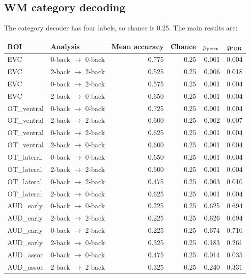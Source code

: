 \documentclass[11pt,a4paper]{article}
\begin{document}
\subsection{WM category decoding}

The category decoder has four labels, so chance is 0.25. The main results are:

\begin{longtable}{p{}p{}rrrr}
\toprule
\textbf{ROI} & \textbf{Analysis} & \textbf{Mean accuracy} & \textbf{Chance} & \textbf{\(p_{\rm perm}\)} & \textbf{\(q_{\rm FDR}\)}\\
\midrule
EVC & 0-back \(\rightarrow\) 0-back & 0.775 & 0.25 & 0.001 & 0.004\\
EVC & 2-back \(\rightarrow\) 2-back & 0.525 & 0.25 & 0.006 & 0.018\\
EVC & 0-back \(\rightarrow\) 2-back & 0.575 & 0.25 & 0.001 & 0.004\\
EVC & 2-back \(\rightarrow\) 0-back & 0.650 & 0.25 & 0.001 & 0.004\\
OT\_ventral & 0-back \(\rightarrow\) 0-back & 0.725 & 0.25 & 0.001 & 0.004\\
OT\_ventral & 2-back \(\rightarrow\) 2-back & 0.600 & 0.25 & 0.002 & 0.007\\
OT\_ventral & 0-back \(\rightarrow\) 2-back & 0.625 & 0.25 & 0.001 & 0.004\\
OT\_ventral & 2-back \(\rightarrow\) 0-back & 0.600 & 0.25 & 0.001 & 0.004\\
OT\_lateral & 0-back \(\rightarrow\) 0-back & 0.650 & 0.25 & 0.001 & 0.004\\
OT\_lateral & 2-back \(\rightarrow\) 2-back & 0.600 & 0.25 & 0.001 & 0.004\\
OT\_lateral & 0-back \(\rightarrow\) 2-back & 0.475 & 0.25 & 0.003 & 0.010\\
OT\_lateral & 2-back \(\rightarrow\) 0-back & 0.625 & 0.25 & 0.001 & 0.004\\
AUD\_early & 0-back \(\rightarrow\) 0-back & 0.225 & 0.25 & 0.625 & 0.694\\
AUD\_early & 2-back \(\rightarrow\) 2-back & 0.225 & 0.25 & 0.626 & 0.694\\
AUD\_early & 0-back \(\rightarrow\) 2-back & 0.225 & 0.25 & 0.674 & 0.710\\
AUD\_early & 2-back \(\rightarrow\) 0-back & 0.325 & 0.25 & 0.183 & 0.261\\
AUD\_assoc & 0-back \(\rightarrow\) 0-back & 0.475 & 0.25 & 0.014 & 0.035\\
AUD\_assoc & 2-back \(\rightarrow\) 2-back & 0.325 & 0.25 & 0.240 & 0.331\\

\end{longtable}
\end{document}
